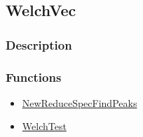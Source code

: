 \subsection{WelchVec}\label{WelchVec}
\subsubsection{Description}


\subsubsection{Functions}
\begin{itemize}
\item \hyperref[NewReduceSpecFindPeaks]{NewReduceSpecFindPeaks}
\item \hyperref[WelchTest]{WelchTest}
\end{itemize}

